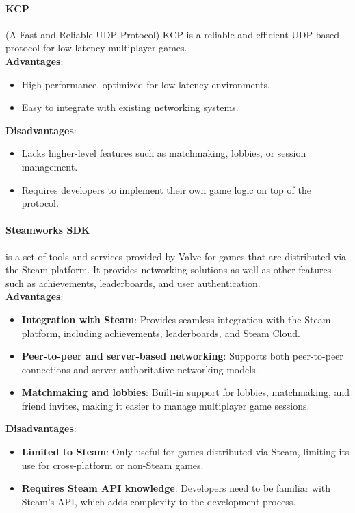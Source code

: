 \documentclass{article} %
\begin{document}
\paragraph{KCP} (A Fast and Reliable UDP Protocol) KCP is a reliable and efficient UDP-based protocol for low-latency multiplayer games.
\\
\textbf{Advantages}:
\begin{itemize}
	\item High-performance, optimized for low-latency environments.
	\item Easy to integrate with existing networking systems.
\end{itemize}
\textbf{Disadvantages}:
\begin{itemize}
	\item Lacks higher-level features such as matchmaking, lobbies, or session management.
	\item Requires developers to implement their own game logic on top of the protocol.
\end{itemize}

\paragraph{Steamworks SDK} is a set of tools and services provided by Valve for games that are distributed via the Steam platform. It provides networking solutions as well as other features such as achievements, leaderboards, and user authentication.
\\
\textbf{Advantages}:
\begin{itemize}
	\item \textbf{Integration with Steam}: Provides seamless integration with the Steam platform, including achievements, leaderboards, and Steam Cloud.
	\item \textbf{Peer-to-peer and server-based networking}: Supports both peer-to-peer connections and server-authoritative networking models.
	\item \textbf{Matchmaking and lobbies}: Built-in support for lobbies, matchmaking, and friend invites, making it easier to manage multiplayer game sessions.
\end{itemize}

\textbf{Disadvantages}:
\begin{itemize}
	\item \textbf{Limited to Steam}: Only useful for games distributed via Steam, limiting its use for cross-platform or non-Steam games.
	\item \textbf{Requires Steam API knowledge}: Developers need to be familiar with Steam's API, which adds complexity to the development process.
\end{itemize}
\end{document}
